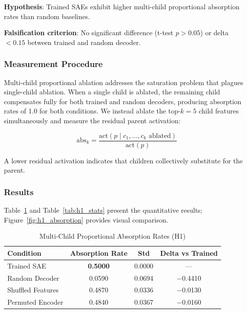 \documentclass{article}
\begin{document}
\textbf{Hypothesis}: Trained SAEs exhibit higher multi-child proportional absorption rates than random baselines.

\textbf{Falsification criterion}: No significant difference (t-test $p > 0.05$) or delta $< 0.15$ between trained and random decoder.

\subsubsection{Measurement Procedure}

Multi-child proportional ablation addresses the saturation problem that plagues single-child ablation. When a single child is ablated, the remaining child compensates fully for both trained and random decoders, producing absorption rates of 1.0 for both conditions. We instead ablate the top-$k=5$ child features simultaneously and measure the residual parent activation:

\begin{equation}
\text{abs}_k = \frac{\text{act}(p \mid c_1, \ldots, c_k \text{ ablated})}{\text{act}(p)}
\end{equation}

A lower residual activation indicates that children collectively substitute for the parent.

\subsubsection{Results}

Table~\ref{tab:h1_main} and Table~\ref{tab:h1_stats} present the quantitative results; Figure~\ref{fig:h1_absorption} provides visual comparison.

\begin{table}[t]
\caption{Multi-Child Proportional Absorption Rates (H1)}
\label{tab:h1_main}
\centering
\begin{tabular}{lccc}
\toprule
Condition & Absorption Rate & Std & Delta vs Trained \\
\midrule
Trained SAE & \textbf{0.5000} & 0.0000 & --- \\
Random Decoder & 0.0590 & 0.0694 & $-$0.4410 \\
Shuffled Features & 0.4870 & 0.0336 & $-$0.0130 \\
Permuted Encoder & 0.4840 & 0.0367 & $-$0.0160 \\
\bottomrule
\end{tabular}
\end{table}
\end{document}
